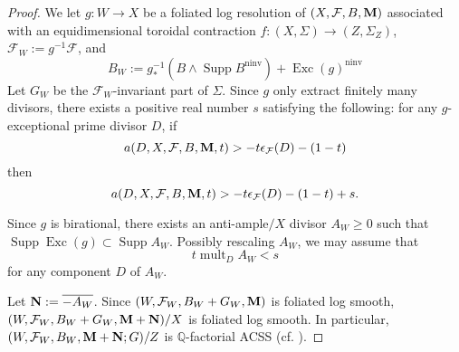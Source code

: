 \documentclass[12pt]{amsart}
\numberwithin{equation}{section}
\newcommand{\Mm}{{\bf{M}}}
\newcommand{\Nn}{{\bf{N}}}
\newcommand{\Qq}{\mathbb{Q}}
\newcommand{\Exc}{\operatorname{Exc}}
\newcommand{\ninv}{\operatorname{ninv}}
\newcommand{\Supp}{\operatorname{Supp}}
\newcommand{\mult}{\operatorname{mult}}
\newcommand{\Ff}{\mathcal{F}}
\theoremstyle{definition}
\theoremstyle{definition}
\theoremstyle{definition}
\begin{document}
\begin{proof}
We let $g: W\rightarrow X$ be a foliated log resolution of $(X,\Ff,B,\Mm)$ associated with an equidimensional toroidal contraction $f: (X,\Sigma)\rightarrow (Z,\Sigma_Z)$, $\Ff_W:= g^{-1}\Ff$, and 
$$B_W:=g^{-1}_*(B\wedge\Supp B^{\ninv})+\Exc(g)^{\ninv}$$
Let $G_W$ be the $\Ff_W$-invariant part of $\Sigma$. Since $g$ only extract finitely many divisors, there exists a positive real number $s$ satisfying the following: for any $g$-exceptional prime divisor $D$, if 
$$a(D,X,\Ff,B,\Mm,t)>-t\epsilon_{\Ff}(D)-(1-t)$$
then 
$$a(D,X,\Ff,B,\Mm,t)>-t\epsilon_{\Ff}(D)-(1-t)+s.$$

Since $g$ is birational, there exists an anti-ample$/X$ divisor $A_W\geq 0$ such that $\Supp\Exc(g)\subset\Supp A_W$. Possibly rescaling $A_W$, we may assume that
$$t\mult_DA_W<s$$
for any component $D$ of $A_W$.


Let $\Nn:=\overline{-A_W}$. Since $(W,\Ff_W,B_W+G_W,\Mm)$ is foliated log smooth, $(W,\Ff_W,B_W+G_W,\Mm+\Nn)/X$ is foliated log smooth. In particular, $(W,\Ff_W,B_W,\Mm+\Nn;G)/Z$ is $\Qq$-factorial ACSS (cf. \cite[Lemma 7.3.3]{CHLX23}).  


\end{proof}
\end{document}
